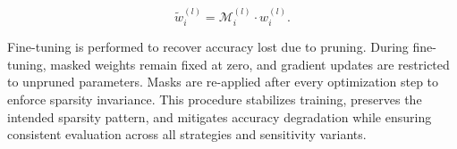 \documentclass[11pt, conference]{IEEEtran}
\begin{document}
\begin{equation}
\tilde{w}_i^{(l)} = \mathcal{M}_i^{(l)} \cdot w_i^{(l)}.
\end{equation}

Fine-tuning is performed to recover accuracy lost due to pruning. During fine-tuning, masked weights remain fixed at zero, and gradient updates are restricted to unpruned parameters. Masks are re-applied after every optimization step to enforce sparsity invariance. This procedure stabilizes training, preserves the intended sparsity pattern, and mitigates accuracy degradation while ensuring consistent evaluation across all strategies and sensitivity variants.









\end{document}
